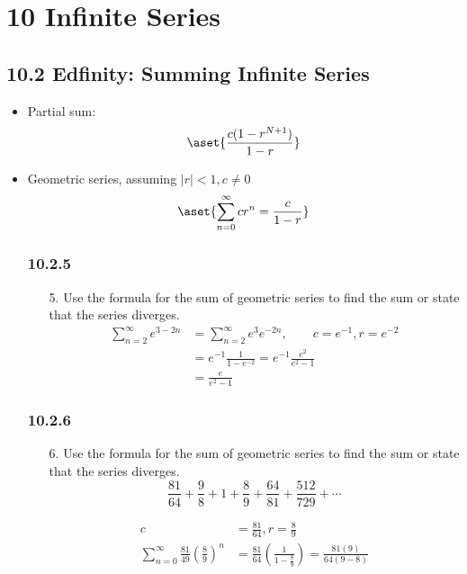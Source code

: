 \chapter{10 Infinite Series}

\section{10.2 Edfinity: Summing Infinite Series}
\begin{itemize}
  \item Partial sum:
    \[%
      \aset{\frac{c(1-r^{N+1})}{1-r}}
    \]%
  \item Geometric series, assuming \(|r| < 1, c \neq 0\)
    \[%
    \aset{\sum_{n=0}^{\infty} cr^n = \frac{c}{1-r}}
    \]%

  \subsection{ 10.2.5}
  \begin{itemize}
  \item[5.] Use the formula for the sum of geometric series to find the sum or
    state that the series diverges.
    \begin{align*}
      \sum_{n=2}^{\infty} e^{3-2n} &= \sum_{n=2}^{\infty} e^3 e^{-2n},\qquad
      c = e^{-1}, r = e^{-2} \\
      &= e^{-1} \frac{1}{1-e^{-2}} = e^{-1} \frac{e^2}{e^2-1} \\
      &= \frac{e}{e^2-1}
    \end{align*}
  \end{itemize}

  \subsection{ 10.2.6}
  \begin{itemize}
    \item[6.] Use the formula for the sum of geometric series to find the sum or
    state that the series diverges.
    \[%
    \frac{81}{64} + \frac{9}{8} + 1 + \frac{8}{9} + \frac{64}{81} + \frac{512}{729} + \cdots
    \]%

    \begin{align*}
      c &= \frac{81}{64}, r = \frac{8}{9} \\
      \sum_{n=0}^{\infty} \frac{81}{49}\left( \frac{8}{9} \right)^n &=
      \frac{81}{64}\left( \frac{1}{1-\frac{8}{9}} \right) =
      \frac{81(9)}{64(9-8)}
    \end{align*}
  \end{itemize}


\end{itemize}
